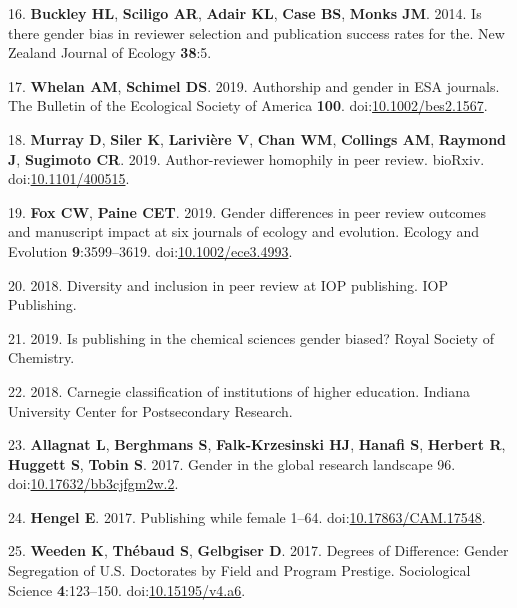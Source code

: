 \documentclass[11pt,]{article}
\begin{document}
\hypertarget{ref-buckley_is_2014}{}
16. \textbf{Buckley HL}, \textbf{Sciligo AR}, \textbf{Adair KL},
\textbf{Case BS}, \textbf{Monks JM}. 2014. Is there gender bias in
reviewer selection and publication success rates for the. New Zealand
Journal of Ecology \textbf{38}:5.

\hypertarget{ref-Whelan2019}{}
17. \textbf{Whelan AM}, \textbf{Schimel DS}. 2019. Authorship and gender
in ESA journals. The Bulletin of the Ecological Society of America
\textbf{100}.
doi:\href{https://doi.org/10.1002/bes2.1567}{10.1002/bes2.1567}.

\hypertarget{ref-Murray400515}{}
18. \textbf{Murray D}, \textbf{Siler K}, \textbf{Larivière V},
\textbf{Chan WM}, \textbf{Collings AM}, \textbf{Raymond J},
\textbf{Sugimoto CR}. 2019. Author-reviewer homophily in peer review.
bioRxiv. doi:\href{https://doi.org/10.1101/400515}{10.1101/400515}.

\hypertarget{ref-fox_gender_2019}{}
19. \textbf{Fox CW}, \textbf{Paine CET}. 2019. Gender differences in
peer review outcomes and manuscript impact at six journals of ecology
and evolution. Ecology and Evolution \textbf{9}:3599--3619.
doi:\href{https://doi.org/10.1002/ece3.4993}{10.1002/ece3.4993}.

\hypertarget{ref-Physics_2018}{}
20. 2018. Diversity and inclusion in peer review at IOP publishing. IOP
Publishing.

\hypertarget{ref-RoyalChem_2019}{}
21. 2019. Is publishing in the chemical sciences gender biased? Royal
Society of Chemistry.

\hypertarget{ref-Carnegie2018}{}
22. 2018. Carnegie classification of institutions of higher education.
Indiana University Center for Postsecondary Research.

\hypertarget{ref-allagnat_gender_2017}{}
23. \textbf{Allagnat L}, \textbf{Berghmans S}, \textbf{Falk-Krzesinski
HJ}, \textbf{Hanafi S}, \textbf{Herbert R}, \textbf{Huggett S},
\textbf{Tobin S}. 2017. Gender in the global research landscape 96.
doi:\href{https://doi.org/10.17632/bb3cjfgm2w.2}{10.17632/bb3cjfgm2w.2}.

\hypertarget{ref-erin_hengel_publishing_2017}{}
24. \textbf{Hengel E}. 2017. Publishing while female 1--64.
doi:\href{https://doi.org/10.17863/CAM.17548}{10.17863/CAM.17548}.

\hypertarget{ref-weeden_degrees_2017}{}
25. \textbf{Weeden K}, \textbf{Thébaud S}, \textbf{Gelbgiser D}. 2017.
Degrees of Difference: Gender Segregation of U.S. Doctorates by Field
and Program Prestige. Sociological Science \textbf{4}:123--150.
doi:\href{https://doi.org/10.15195/v4.a6}{10.15195/v4.a6}.
\end{document}
